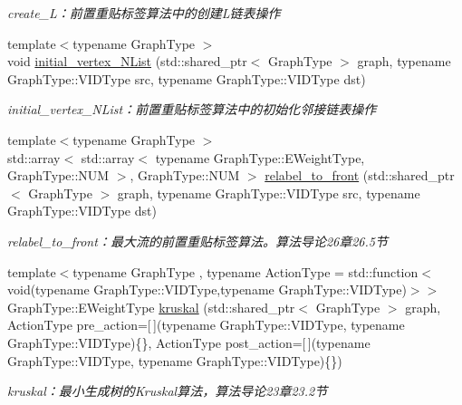 \begin{DoxyCompactItemize}
\begin{DoxyCompactList}\small\item\em create\+\_\+\+L：前置重贴标签算法中的创建\+L链表操作 \end{DoxyCompactList}\item 
{\footnotesize template$<$typename Graph\+Type $>$ }\\void \hyperlink{namespace_introduction_to_algorithm_1_1_graph_algorithm_af1dfc9c1874850fb1415db3644497777}{initial\+\_\+vertex\+\_\+\+N\+List} (std\+::shared\+\_\+ptr$<$ Graph\+Type $>$ graph, typename Graph\+Type\+::\+V\+I\+D\+Type src, typename Graph\+Type\+::\+V\+I\+D\+Type dst)
\begin{DoxyCompactList}\small\item\em initial\+\_\+vertex\+\_\+\+N\+List：前置重贴标签算法中的初始化邻接链表操作 \end{DoxyCompactList}\item 
{\footnotesize template$<$typename Graph\+Type $>$ }\\std\+::array$<$ std\+::array$<$ typename Graph\+Type\+::\+E\+Weight\+Type, Graph\+Type\+::\+N\+U\+M $>$, Graph\+Type\+::\+N\+U\+M $>$ \hyperlink{namespace_introduction_to_algorithm_1_1_graph_algorithm_abafb73bda29c4e389edb048a5e5d8d2b}{relabel\+\_\+to\+\_\+front} (std\+::shared\+\_\+ptr$<$ Graph\+Type $>$ graph, typename Graph\+Type\+::\+V\+I\+D\+Type src, typename Graph\+Type\+::\+V\+I\+D\+Type dst)
\begin{DoxyCompactList}\small\item\em relabel\+\_\+to\+\_\+front：最大流的前置重贴标签算法。算法导论26章26.5节 \end{DoxyCompactList}\item 
{\footnotesize template$<$typename Graph\+Type , typename Action\+Type  = std\+::function$<$ void(typename Graph\+Type\+::\+V\+I\+D\+Type,typename Graph\+Type\+::\+V\+I\+D\+Type)$>$$>$ }\\Graph\+Type\+::\+E\+Weight\+Type \hyperlink{namespace_introduction_to_algorithm_1_1_graph_algorithm_a2575c09c42d0b30b57702c9379d2fbfb}{kruskal} (std\+::shared\+\_\+ptr$<$ Graph\+Type $>$ graph, Action\+Type pre\+\_\+action=\mbox{[}$\,$\mbox{]}(typename Graph\+Type\+::\+V\+I\+D\+Type, typename Graph\+Type\+::\+V\+I\+D\+Type)\{\}, Action\+Type post\+\_\+action=\mbox{[}$\,$\mbox{]}(typename Graph\+Type\+::\+V\+I\+D\+Type, typename Graph\+Type\+::\+V\+I\+D\+Type)\{\})
\begin{DoxyCompactList}\small\item\em kruskal：最小生成树的\+Kruskal算法，算法导论23章23.2节 \end{DoxyCompactList}\item 

\end{DoxyCompactItemize}
